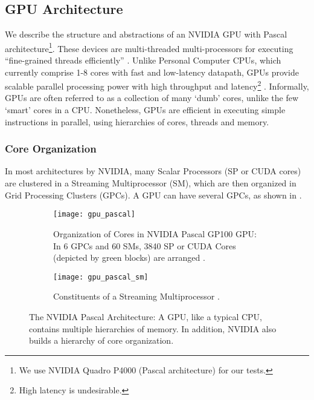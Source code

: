 \subsection{GPU Architecture} \label{sec:GPU Architecture}
We describe the structure and abstractions of an NVIDIA GPU with Pascal architecture\footnote{We use NVIDIA Quadro P4000 (Pascal architecture) for our tests.}. These devices are multi-threaded multi-processors for executing ``fine-grained threads efficiently'' \cite[Appendix~B.4]{PattersonARM}. Unlike Personal Computer CPUs, which currently comprise 1-8 cores with fast and low-latency datapath, GPUs provide scalable parallel processing power with high throughput and latency\footnote{High latency is undesirable.} \cite{PattersonARM, DemystifyingGPU}. Informally, GPUs are often referred to as a collection of many `dumb' cores, unlike the few `smart' cores in a CPU. Nonetheless, GPUs are efficient in executing simple instructions in parallel, using hierarchies of cores, threads and memory.

\subsubsection{Core Organization}
In most architectures by NVIDIA, many Scalar Processors (SP or CUDA cores) are clustered in a Streaming Multiprocessor (SM), which are then organized in Grid Processing Clusters (GPCs). A GPU can have several GPCs, as shown in  \cite{CUDADocs, ParallelNVIDIA, DemystifyingGPU}.
\begin{figure}
    \centering
    \begin{subfigure}{\textwidth}
        \centering
        \texttt{[image: gpu\_pascal]}
        \caption[Organization of Cores in NVIDIA Pascal GP100 GPU]{Organization of Cores in NVIDIA Pascal GP100 GPU: In 6 GPCs and 60 SMs, 3840 SP or CUDA Cores (depicted by green blocks) are arranged \cite{PascalWhitepaper, ParallelNVIDIA}.}
        \label{fig:Organization of Cores in NVIDIA Pascal GP100 GPU}
    \end{subfigure}\vspace*{1em}
    \begin{subfigure}{\textwidth}
        \centering
        \texttt{[image: gpu\_pascal\_sm]}
        \caption[Constituents of a Streaming Multiprocessor]{Constituents of a Streaming Multiprocessor \cite{PascalWhitepaper, ParallelNVIDIA}.}
        \label{fig:Constituents of a Streaming Multiprocessor}
    \end{subfigure}
    \caption[The NVIDIA Pascal Architecture]{The NVIDIA Pascal Architecture: A GPU, like a typical CPU, contains multiple hierarchies of memory. In addition, NVIDIA also builds a hierarchy of core organization.}
    \label{fig:The NVIDIA Pascal Architecture}
\end{figure}

